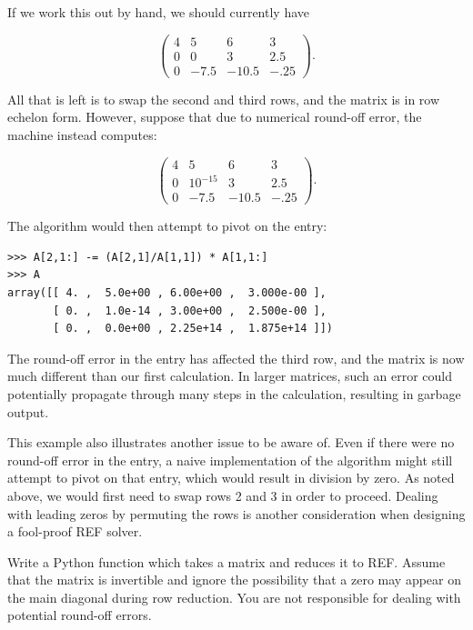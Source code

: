 If we work this out by hand, we should currently have

\[
\begin{pmatrix}
4&5&6&3 \\
0&0&3&2.5 \\
0&-7.5&-10.5&-.25
\end{pmatrix}.
\]

All that is left is to swap the second and third rows, and the matrix is in row echelon form. However, suppose that due to numerical round-off error, the machine instead computes:

\[
\begin{pmatrix}
4&5&6&3 \\
0&10^{-15}&3&2.5 \\
0&-7.5&-10.5&-.25
\end{pmatrix}.
\]

The algorithm would then attempt to pivot on the  entry:

\begin{lstlisting}
>>> A[2,1:] -= (A[2,1]/A[1,1]) * A[1,1:]
>>> A
array([[ 4. ,  5.0e+00 , 6.00e+00 ,  3.000e-00 ],
       [ 0. ,  1.0e-14 , 3.00e+00 ,  2.500e-00 ],
       [ 0. ,  0.0e+00 , 2.25e+14 ,  1.875e+14 ]])
\end{lstlisting}

The round-off error in the  entry has affected the third
row, and the matrix is now much different than our first calculation. In larger matrices, such an error could potentially propagate through many steps in the calculation, resulting in garbage output.

This example also illustrates another issue to be aware of. Even if there were no round-off error in the  entry, a naive implementation of the algorithm might still attempt to pivot on that entry, which would result in division by zero. As noted above, we would first need to swap rows 2 and 3 in order to proceed. Dealing with leading zeros by permuting the rows is another consideration when designing a fool-proof REF solver.

\begin{problem}
\label{prob:REF}
Write a Python function which takes a matrix and reduces it to REF.
Assume that the matrix is invertible and ignore the possibility that a zero may appear on the main diagonal during row reduction. You are not
responsible for dealing with potential round-off errors.
\end{problem}

